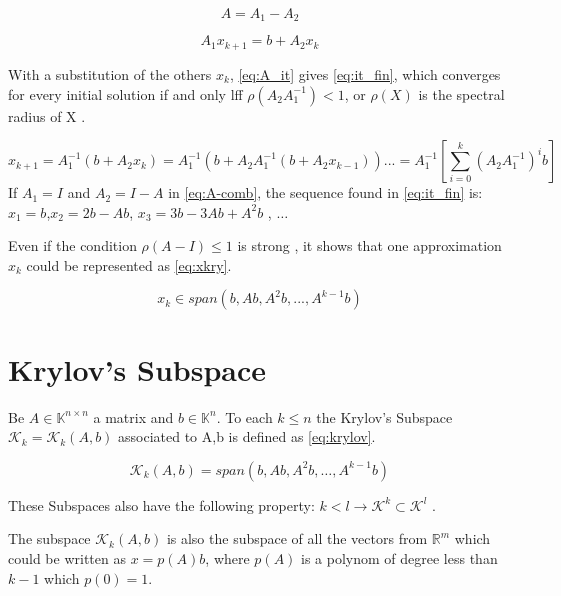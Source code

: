 \begin{equation}\label{eq:A-comb}
    A = A_{1} - A_{2}
\end{equation}

\begin{equation}\label{eq:A_it}
    A_{1} x_{k+1} = b + A_{2}x_{k}
\end{equation}

With a substitution of the others $x_{k}$, \ref{eq:A_it} gives \ref{eq:it_fin}, which converges for every initial solution if and only lff $\rho(A_{2}A_{1}^{-1}) < 1$, or $\rho(X)$ is the spectral radius of X \cite{bonnet}.

\begin{equation}\label{eq:it_fin}
    x_{k+1} = A_{1}^{-1}(b + A_{2}x_{k}) = A_{1}^{-1}(b + A_{2}A_{1}^{-1}(b + A_{2}x_{k-1}))... = A_{1}^{-1} \left[ \sum_{i=0}^{k} (A_{2}A_{1}^{-1})^{i}b\right]
\end{equation}
If $A_{1} = I$ and $A_{2} = I - A$ in \ref{eq:A-comb}, the sequence found in \ref{eq:it_fin} is: $x_{1} = b$,$x_{2} = 2b- Ab$, $x_{3} = 3b-3Ab+A^{2}b$ , $\dots$

Even if the condition $\rho(A-I) \leq 1$ is strong \cite{bonnet}, it shows that one approximation $x_{k}$ could be represented as \ref{eq:xkry}.

\begin{equation}\label{eq:xkry}
    x_{k} \in span(b,Ab,A^{2}b,...,A^{k-1}b)
\end{equation}

\section{Krylov's Subspace}
Be $A \in \mathbb{K}^{n \times n}$ a matrix and $b\in \mathbb{K}^{n}$. To each $k\leq n$ the Krylov's Subspace $\mathcal{K}_{k}=\mathcal{K}_{k}(A,b)$ associated to A,b is defined as \ref{eq:krylov}.

\begin{equation}\label{eq:krylov}
    \mathcal{K}_{k}(A,b) = span(b,Ab,A^{2}b,\dots , A^{k-1}b)
\end{equation}

These Subspaces also have the following property: $k<l \to \mathcal{K}^{k} \subset \mathcal{K}^{l}$ \cite{bonnet}.

The subspace $\mathcal{K}_{k}(A,b)$ is also the subspace of all the vectors from $\mathbb{R}^{m}$ which could be written as $x=p(A)b$, where $p(A)$ is a polynom of degree less than $k-1$ which $p(0)=1$.

